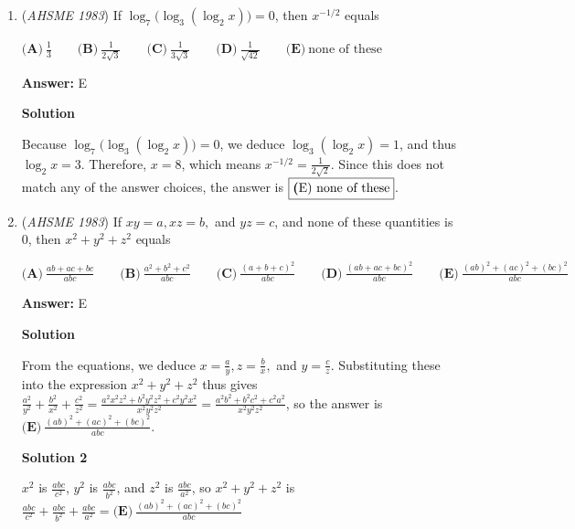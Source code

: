 \begin{enumerate}
\textbf{Solution}

By the addition formula for $\sin$, this becomes $\sin{((x-y)+y)} = \sin{x}$, so the answer is $\boxed{\textbf{(B)}}$.

 


	\item (\textit{AHSME 1983}) If $\log_7 \Big(\log_3 (\log_2 x) \Big) = 0$, then $x^{-1/2}$ equals 


 $\textbf{(A)} \ \frac{1}{3} \qquad  \textbf{(B)} \ \frac{1}{2 \sqrt 3} \qquad  \textbf{(C)}\ \frac{1}{3\sqrt 3}\qquad \textbf{(D)}\ \frac{1}{\sqrt{42}}\qquad \textbf{(E)}\ \text{none of these}$

 \textbf{Answer: }E



\textbf{Solution}

Because $\log_7 \Big(\log_3 (\log_2 x) \Big) = 0$, we deduce $\log_3 (\log_2 x) =1$, and thus $\log_2 x=3$. Therefore, $x=8$, which means $x^{-1/2}=\frac{1}{2\sqrt{2}}$. Since this does not match any of the answer choices, the answer is $\fbox{{\textbf(E)} \text{none of these}}$.

 


	\item (\textit{AHSME 1983}) If $xy = a, xz =b,$ and $yz = c$, and none of these quantities is $0$, then $x^2+y^2+z^2$ equals


 $\textbf{(A)}\ \frac{ab+ac+bc}{abc}\qquad \textbf{(B)}\ \frac{a^2+b^2+c^2}{abc}\qquad \textbf{(C)}\ \frac{(a+b+c)^2}{abc}\qquad \textbf{(D)}\ \frac{(ab+ac+bc)^2}{abc}\qquad \textbf{(E)}\ \frac{(ab)^2+(ac)^2+(bc)^2}{abc}$

 \textbf{Answer: }E



\textbf{Solution}

From the equations, we deduce $x = \frac{a}{y}, z = \frac{b}{x},$ and $y = \frac{c}{z}$. Substituting these into the expression $x^2+y^2+z^2$ thus gives $\frac{a^2}{y^2} + \frac{b^2}{x^2} + \frac{c^2}{z^2} = \frac{a^2x^2z^2+b^2y^2z^2+c^2y^2x^2}{x^2y^2z^2} = \frac{a^2b^2+b^2c^2+c^2a^2}{x^2y^2z^2}$, so the answer is $\boxed{\textbf{(E)}\ \frac{(ab)^2+(ac)^2+(bc)^2}{abc}}$.

 



\textbf{Solution 2}

$x^2$ is $\frac{abc}{c^2}$, $y^2$ is $\frac{abc}{b^2}$, and $z^2$ is $\frac{abc}{a^2}$, so $x^2+y^2+z^2$ is $\frac{abc}{c^2}+\frac{abc}{b^2}+\frac{abc}{a^2}= \boxed{\textbf{(E)}\ \frac{(ab)^2+(ac)^2+(bc)^2}{abc}}$


\end{enumerate}
